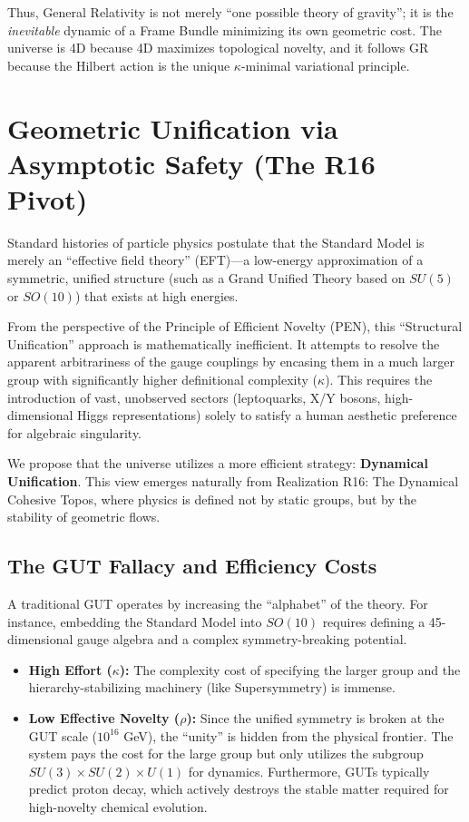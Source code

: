 \documentclass[12pt,a4paper]{article}
\theoremstyle{definition}
\newcommand{\kap}{\kappa}
\newcommand{\SM}{SU(3) \times SU(2) \times U(1)}
\begin{document}
Thus, General Relativity is not merely ``one possible theory of gravity''; it is the \emph{inevitable} dynamic of a Frame Bundle minimizing its own geometric cost. The universe is 4D because 4D maximizes topological novelty, and it follows GR because the Hilbert action is the unique $\kap$-minimal variational principle.

\section{Geometric Unification via Asymptotic Safety (The R16 Pivot)}

Standard histories of particle physics postulate that the Standard Model is merely an ``effective field theory'' (EFT)—a low-energy approximation of a symmetric, unified structure (such as a Grand Unified Theory based on $SU(5)$ or $SO(10)$) that exists at high energies.

From the perspective of the Principle of Efficient Novelty (PEN), this ``Structural Unification'' approach is mathematically inefficient. It attempts to resolve the apparent arbitrariness of the gauge couplings by encasing them in a much larger group with significantly higher definitional complexity ($\kap$). This requires the introduction of vast, unobserved sectors (leptoquarks, X/Y bosons, high-dimensional Higgs representations) solely to satisfy a human aesthetic preference for algebraic singularity.

We propose that the universe utilizes a more efficient strategy: \textbf{Dynamical Unification}. This view emerges naturally from Realization R16: The Dynamical Cohesive Topos, where physics is defined not by static groups, but by the stability of geometric flows.

\subsection{The GUT Fallacy and Efficiency Costs}

A traditional GUT operates by increasing the ``alphabet'' of the theory. For instance, embedding the Standard Model into $SO(10)$ requires defining a 45-dimensional gauge algebra and a complex symmetry-breaking potential.

\begin{itemize}[leftmargin=2em]
    \item \textbf{High Effort ($\kap$):} The complexity cost of specifying the larger group and the hierarchy-stabilizing machinery (like Supersymmetry) is immense.
    \item \textbf{Low Effective Novelty ($\rho$):} Since the unified symmetry is broken at the GUT scale ($10^{16}$ GeV), the ``unity'' is hidden from the physical frontier. The system pays the cost for the large group but only utilizes the subgroup $\SM$ for dynamics. Furthermore, GUTs typically predict proton decay, which actively destroys the stable matter required for high-novelty chemical evolution.
\end{itemize}
\end{document}
